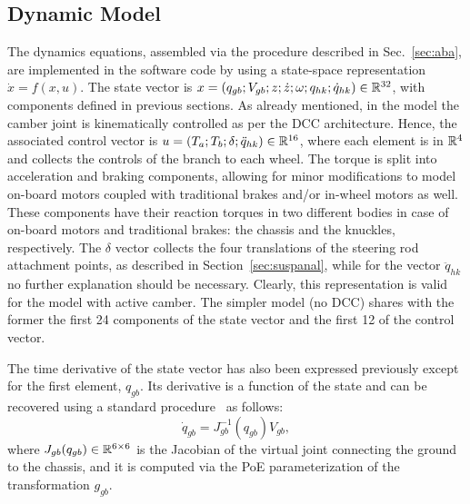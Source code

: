 \subsection{Dynamic Model}
The dynamics equations, assembled via the procedure described  in Sec.~\ref{sec:aba}, are implemented in the software code by using a state-space representation $\dot{x}=f(x,u)$.
The state vector is $x = (q_{gb};V_{gb};z;\dot{z};\omega;q_{hk};\dot{q}_{hk})\in\mathbb{R}^{32}$, with components defined in previous sections. As already mentioned, in the model the camber joint is kinematically controlled as per the DCC architecture. Hence, the associated control vector is $u=(T_a;T_b;\delta;\ddot{q}_{hk})\in\mathbb{R}^{16}$, where each element is in $\mathbb{R}^{4}$ and collects the controls of the branch to each wheel. The torque is split into acceleration and braking components, allowing for minor modifications to model on-board motors coupled with traditional brakes and/or in-wheel motors as well. These components have their reaction torques in two different bodies in case of on-board motors and traditional brakes: the chassis and the knuckles, respectively. The $\delta$ vector collects the four translations of the steering rod attachment points, as described in Section~\ref{sec:suspanal}, while for the vector $\ddot{q}_{hk}$ no further explanation should be necessary. Clearly, this representation is valid for the model with active camber. The simpler model (no DCC) shares with the former the first 24 components of the state vector and the first 12 of the control vector.

The time derivative of the state vector has also been expressed previously except for the first element, $q_{gb}$. Its derivative is a function of the state and can be recovered using a standard procedure~\cite{Domenighini:Designs:2023} as follows:
\begin{equation}\label{eqn:dotqgb}
	\dot{q}_{gb}=J_{gb}^{-1}(q_{gb})V_{gb},
\end{equation}
where $J_{gb}(q_{gb})\in\mathbb{R}^{6\times6}$ is the Jacobian of the virtual joint connecting the ground to the chassis, and it is computed via the PoE parameterization of the transformation $g_{gb}$.

